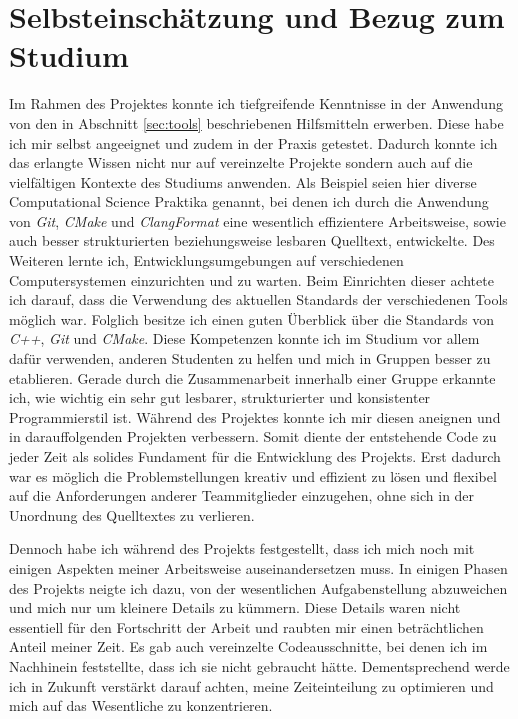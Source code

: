 \documentclass[crop=false]{standalone}
\begin{document}
  \section{Selbsteinschätzung und Bezug zum Studium} %
  \label{sec:selbsteinschaetzung}
    Im Rahmen des Projektes konnte ich tiefgreifende Kenntnisse in der Anwendung von den in Abschnitt \ref{sec:tools} beschriebenen Hilfsmitteln erwerben.
    Diese habe ich mir selbst angeeignet und zudem in der Praxis getestet.
    Dadurch konnte ich das erlangte Wissen nicht nur auf vereinzelte Projekte sondern auch auf die vielfältigen Kontexte des Studiums anwenden.
    Als Beispiel seien hier diverse Computational Science Praktika genannt, bei denen ich durch die Anwendung von \textit{Git}, \textit{CMake} und \textit{ClangFormat} eine wesentlich effizientere Arbeitsweise, sowie auch besser strukturierten beziehungsweise lesbaren Quelltext, entwickelte.
    Des Weiteren lernte ich, Entwicklungsumgebungen auf verschiedenen Computersystemen einzurichten und zu warten.
    Beim Einrichten dieser achtete ich darauf, dass die Verwendung des aktuellen Standards der verschiedenen Tools möglich war.
    Folglich besitze ich einen guten Überblick über die Standards von \textit{C++}, \textit{Git} und \textit{CMake}.
    Diese Kompetenzen konnte ich im Studium vor allem dafür verwenden, anderen Studenten zu helfen und mich in Gruppen besser zu etablieren.
    Gerade durch die Zusammenarbeit innerhalb einer Gruppe erkannte ich, wie wichtig ein sehr gut lesbarer, strukturierter und konsistenter Programmierstil ist.
    Während des Projektes konnte ich mir diesen aneignen und in darauffolgenden Projekten verbessern.
    Somit diente der entstehende Code zu jeder Zeit als solides Fundament für die Entwicklung des Projekts.
    Erst dadurch war es möglich die Problemstellungen kreativ und effizient zu lösen und flexibel auf die Anforderungen anderer Teammitglieder einzugehen, ohne sich in der Unordnung des Quelltextes zu verlieren.

    Dennoch habe ich während des Projekts festgestellt, dass ich mich noch mit einigen Aspekten meiner Arbeitsweise auseinandersetzen muss.
    In einigen Phasen des Projekts neigte ich dazu, von der wesentlichen Aufgabenstellung abzuweichen und mich nur um kleinere Details zu kümmern.
    Diese Details waren nicht essentiell für den Fortschritt der Arbeit und raubten mir einen beträchtlichen Anteil meiner Zeit.
    Es gab auch vereinzelte Codeausschnitte, bei denen ich im Nachhinein feststellte, dass ich sie nicht gebraucht hätte.
    Dementsprechend werde ich in Zukunft verstärkt darauf achten, meine Zeiteinteilung zu optimieren und mich auf das Wesentliche zu konzentrieren.
\end{document}
